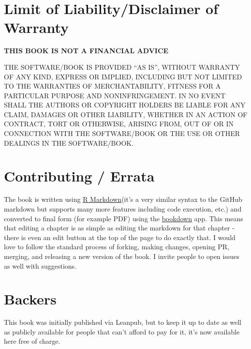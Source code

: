 \documentclass[
  oneside]{book}
\begin{document}
\hypertarget{limit-of-liabilitydisclaimer-of-warranty}{%
\section*{Limit of Liability/Disclaimer of Warranty}\label{limit-of-liabilitydisclaimer-of-warranty}}

\textbf{THIS BOOK IS NOT A FINANCIAL ADVICE}

THE SOFTWARE/BOOK IS PROVIDED ``AS IS'', WITHOUT WARRANTY OF ANY KIND, EXPRESS OR IMPLIED, INCLUDING BUT NOT LIMITED TO THE WARRANTIES OF MERCHANTABILITY, FITNESS FOR A PARTICULAR PURPOSE AND NONINFRINGEMENT. IN NO EVENT SHALL THE AUTHORS OR COPYRIGHT HOLDERS BE LIABLE FOR ANY CLAIM, DAMAGES OR OTHER LIABILITY, WHETHER IN AN ACTION OF CONTRACT, TORT OR OTHERWISE, ARISING FROM, OUT OF OR IN CONNECTION WITH THE SOFTWARE/BOOK OR THE USE OR OTHER DEALINGS IN THE SOFTWARE/BOOK.

\hypertarget{contributing-errata}{%
\section*{Contributing / Errata}\label{contributing-errata}}

The book is written using \href{http://rmarkdown.rstudio.com/}{R Markdown}(it's a very similar syntax to the GitHub markdown but supports many more features including code execution, etc.) and converted to final form (for example PDF) using the \href{https://www.bookdown.org/}{bookdown} app. This means that editing a chapter is as simple as editing the markdown for that chapter - there is even an edit button at the top of the page to do exactly that. I would love to follow the standard process of forking, making changes, opening PR, merging, and releasing a new version of the book. I invite people to open issues as well with suggestions.

\hypertarget{backers}{%
\section*{Backers}\label{backers}}

This book was initially published via Leanpub, but to keep it up to date as well as publicly available for people that can't afford to pay for it, it's now available here free of charge.
\end{document}
